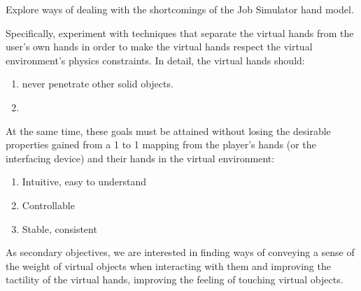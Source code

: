 Explore ways of dealing with the shortcomings of the Job Simulator hand model.

Specifically, experiment with techniques that separate the virtual hands from the user's own hands in order to make the virtual hands respect the virtual environment's physics constraints. In detail, the virtual hands should:

\begin{enumerate}
\item never penetrate other solid objects.
\item 
\end{enumerate}

At the same time, these goals must be attained without losing the desirable properties gained from a 1 to 1 mapping from the player's hands (or the interfacing device) and their hands in the virtual environment:

\begin{enumerate}
\item Intuitive, easy to understand
\item Controllable
\item Stable, consistent
\end{enumerate}

As secondary objectives, we are interested in finding ways of conveying a sense of the weight of virtual objects when interacting with them and improving the tactility of the virtual hands, improving the feeling of touching virtual objects.